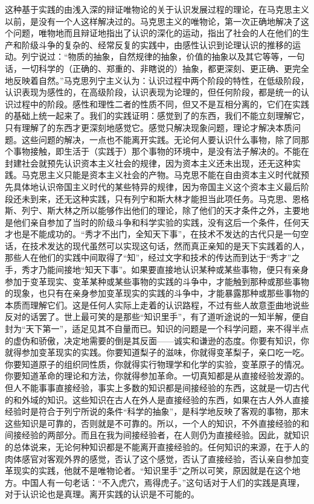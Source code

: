 这种基于实践的由浅入深的辩证唯物论的关于认识发展过程的理论，在马克思主义以前，是没有一个人这样解决过的。马克思主义的唯物论，第一次正确地解决了这个问题，唯物地而且辩证地指出了认识的深化的运动，指出了社会的人在他们的生产和阶级斗争的复杂的、经常反复的实践中，由感性认识到论理认识的推移的运动。列宁说过：“物质的抽象，自然规律的抽象，价值的抽象以及其它等等，一句话，一切科学的（正确的、郑重的、非瞎说的）抽象，都更深刻、更正确、更完全地反映着自然。”马克思列宁主义认为：认识过程中两个阶段的特性，在低级阶段，认识表现为感性的，在高级阶段，认识表现为论理的，但任何阶段，都是统一的认识过程中的阶段。感性和理性二者的性质不同，但又不是互相分离的，它们在实践的基础上统一起来了。我们的实践证明：感觉到了的东西，我们不能立刻理解它，只有理解了的东西才更深刻地感觉它。感觉只解决现象问题，理论才解决本质问题。这些问题的解决，一点也不能离开实践。无论何人要认识什么事物，除了同那个事物接触，即生活于（实践于）那个事物的环境中，是没有法子解决的。不能在封建社会就预先认识资本主义社会的规律，因为资本主义还未出现，还无这种实践。马克思主义只能是资本主义社会的产物。马克思不能在自由资本主义时代就预先具体地认识帝国主义时代的某些特异的规律，因为帝国主义这个资本主义最后阶段还未到来，还无这种实践，只有列宁和斯大林才能担当此项任务。马克思、恩格斯、列宁、斯大林之所以能够作出他们的理论，除了他们的天才条件之外，主要地是他们亲自参加了当时的阶级斗争和科学实验的实践，没有这后一个条件，任何天才也是不能成功的。“秀才不出门，全知天下事”，在技术不发达的古代只是一句空话，在技术发达的现代虽然可以实现这句话，然而真正亲知的是天下实践着的人，那些人在他们的实践中间取得了“知”，经过文字和技术的传达而到达于“秀才”之手，秀才乃能间接地“知天下事”。如果要直接地认识某种或某些事物，便只有亲身参加于变革现实、变革某种或某些事物的实践的斗争中，才能触到那种或那些事物的现象，也只有在亲身参加变革现实的实践的斗争中，才能暴露那种或那些事物的本质而理解它们。这是任何人实际上走着的认识路程，不过有些人故意歪曲地说些反对的话罢了。世上最可笑的是那些“知识里手”，有了道听途说的一知半解，便自封为“天下第一”，适足见其不自量而已。知识的问题是一个科学问题，来不得半点的虚伪和骄傲，决定地需要的倒是其反面——诚实和谦逊的态度。你要有知识，你就得参加变革现实的实践。你要知道梨子的滋味，你就得变革梨子，亲口吃一吃。你要知道原子的组织同性质，你就得实行物理学和化学的实验，变革原子的情况。你要知道革命的理论和方法，你就得参加革命。一切真知都是从直接经验发源的。但人不能事事直接经验，事实上多数的知识都是间接经验的东西，这就是一切古代的和外域的知识。这些知识在古人在外人是直接经验的东西，如果在古人外人直接经验时是符合于列宁所说的条件“科学的抽象”，是科学地反映了客观的事物，那末这些知识是可靠的，否则就是不可靠的。所以，一个人的知识，不外直接经验的和间接经验的两部分。而且在我为间接经验者，在人则仍为直接经验。因此，就知识的总体说来，无论何种知识都是不能离开直接经验的。任何知识的来源，在于人的肉体感官对客观外界的感觉，否认了这个感觉，否认了直接经验，否认亲自参加变革现实的实践，他就不是唯物论者。“知识里手”之所以可笑，原因就是在这个地方。中国人有一句老话：“不入虎穴，焉得虎子。”这句话对于人们的实践是真理，对于认识论也是真理。离开实践的认识是不可能的。

